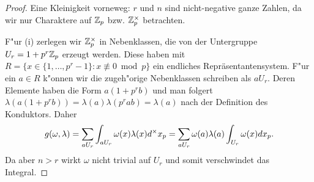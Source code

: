 	\begin{proof}
		Eine Kleinigkeit vorneweg: $r$ und $n$ sind nicht-negative ganze Zahlen, da wir nur Charaktere auf ${\mathbb{Z}_p}$ bzw. $\mathbb{Z}_p^\times$ betrachten.
		
		F"ur (i) zerlegen wir $\mathbb{Z}_p^\times$ in Nebenklassen, die von der Untergruppe $U_r=1+p^r{\mathbb{Z}_p}$ erzeugt werden.
		Diese haben mit $R=\{x \in \{ 1,\dots,p^{r}-1\}: x \not\equiv 0 \bmod{p}\}$ ein endliches Repräsentantensystem.
		F"ur ein $a \in R$ k"onnen wir die zugeh"orige Nebenklassen schreiben als $aU_r$.
		Deren Elemente haben die Form $a(1+p^rb)$ und man folgert $\lambda(a(1+p^rb)) = \lambda(a)\lambda(p^rab) = \lambda(a)$ nach der Definition des Konduktors.
		Daher
		\begin{align*}
			g(\omega,\lambda) = \sum_{aU_r}  \int_{aU_r} \omega(x)\lambda(x) d^\times {x}_p = \sum_{aU_r} \omega(a)\lambda(a) \int_{U_r} \omega(x)d{x}_p.
		\end{align*}
		Da aber $n>r$ wirkt $\omega$ nicht trivial auf $U_r$ und somit verschwindet das Integral.
		

\end{proof}
